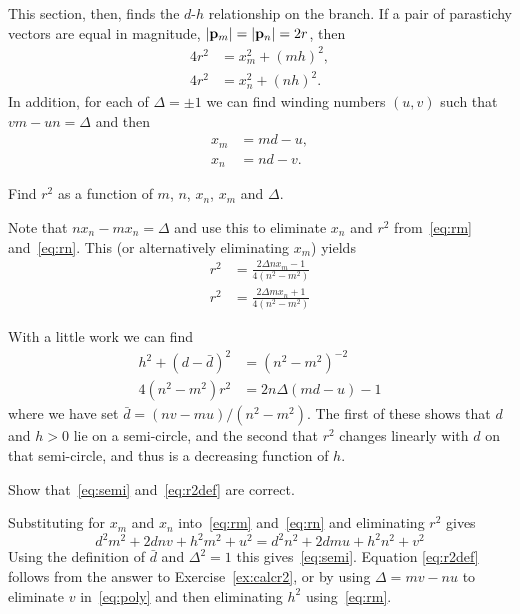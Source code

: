 This section, then, finds the $d$-$h$ relationship on the   branch.
If a pair of parastichy vectors are  equal in magnitude, $\left|{\mathbf p}_{m}\right|=\left|{\mathbf p}_{n}\right|=2r$, then 
\begin{align}
 	\label{eq:rm}
4 r^2&=x_m^2 + (mh)^2,\\
\label{eq:rn}
4 r^2&= x_n^2 + (nh)^2.
\end{align}
In addition, for each of $\Delta=\pm1$ we can find winding numbers $(u,v)$ such that $vm-un=\Delta$ 
and then
 \begin{align}
  x_m&=md-u,\\ 
  x_n&=nd-v. 
  \end{align}
\begin{jExercise}
	\label{ex:calcr2}
	Find $r^2$ as a function of $m$, $n$, $x_n$, $x_m$ and $\Delta$.
\end{jExercise}
\begin{jAnswer}
	Note that $n x_n - m x_n=\Delta$ and use this to eliminate $x_n$ and $r^2$ from~\eqref{eq:rm} and~\eqref{eq:rn}.
	This (or alternatively eliminating $x_m$) yields
	\begin{align}
	r^2		&= \frac{2 \Delta n x_m -1}{4(n^2-m^2)} \label{ex:r2xm}
		\\
		r^2		&=  \frac{2 \Delta m x_n + 1}{4(n^2-m^2)} \label{ex:r2xn}
	\end{align}

\end{jAnswer}
With a little work we can find
 \begin{align}
h^2  +  (d-\bar d)^2 
 &= (n^2-m^2)^{-2} \label{eq:semi}
\\
\label{eq:r2def}
4  (n^2-m^2) r^2 &= 2  n \Delta ( m d - u)-1
\end{align}
where we have set  $\bar d= {(nv-mu)}/{(n^2-m^2)}$. The first of these shows that $d$ and $h>0$ lie on a semi-circle, and the second that $r^2$ changes linearly with $d$ on that semi-circle, and thus is a decreasing function of $h$.
\begin{jExercise}
	Show that~\eqref{eq:semi} and~\eqref{eq:r2def} are correct.
\end{jExercise} 
\begin{jAnswer}
Substituting for $x_m$ and $x_n$ into~\eqref{eq:rm} and~\eqref{eq:rn} and eliminating $r^2$ gives
\begin{equation}
	\label{eq:poly}
d^2 m^2+2 d n v+h^2 m^2+u^2=d^2 n^2+2 d m u+h^2 n^2+v^2
\end{equation}
Using the definition of $\bar{d}$ and $\Delta^2=1$ this gives~\eqref{eq:semi}. 
Equation \eqref{eq:r2def} follows from the answer to Exercise~\ref{ex:calcr2}, or by 
 using $\Delta=mv-nu$ to eliminate $v$ in~\eqref{eq:poly} and then eliminating $h^2$ using~\eqref{eq:rm}.

\end{jAnswer}



